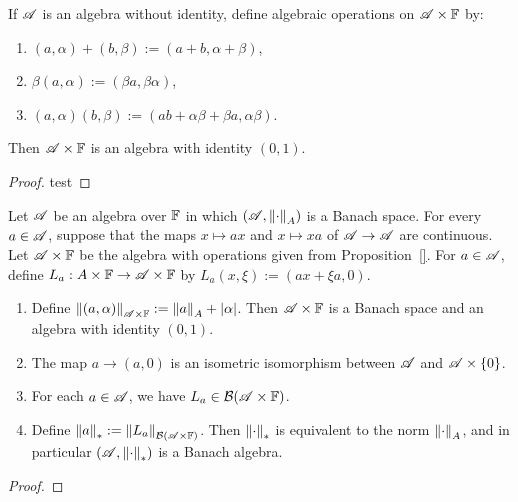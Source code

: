 \begin{proposition}
If $\mathscr{A}$ is an algebra without identity, define algebraic operations on $\mathscr{A} \times \mathbb{F}$ by:
	\mbox{}
	\begin{enumerate}[label = (\roman*),itemsep=1pt,topsep=3pt]
		\item $(a,\alpha) + (b,\beta) := (a+b,\alpha + \beta)$,
		\item $\beta(a,\alpha) := (\beta a, \beta \alpha)$,
		\item $(a,\alpha)(b,\beta) := (ab + \alpha \beta + \beta a, \alpha \beta)$.
	\end{enumerate}
	Then $\mathscr{A} \times \mathbb{F}$ is an algebra with identity $(0,1)$.
\end{proposition}
	{\color{red}
	\begin{proof}
			test
	\end{proof}}


\begin{proposition}
	Let $\mathscr{A}$ be an algebra over $\mathbb{F}$ in which $(\mathscr{A},\left\lVert \cdot \right\rVert_A)$ is a Banach space. For every $a \in \mathscr{A}$, suppose that the maps $x \mapsto ax$ and $x \mapsto xa$ of $\mathscr{A} \rightarrow \mathscr{A}$ are continuous. Let $\mathscr{A} \times \mathbb{F}$ be the algebra with operations given from Proposition~\ref{}. For $a \in \mathscr{A}$, define $L_a:A \times \mathbb{F} \rightarrow \mathscr{A} \times \mathbb{F}$ by $L_a(x,\xi) := (ax + \xi a,0)$.
\end{proposition}
	\mbox{}
	\begin{enumerate}[label = (\arabic*),itemsep=1pt,topsep=3pt]
		\item Define $\left\lVert (a,\alpha) \right\rVert_{\mathscr{A} \times \mathbb{F}}:= \left\lVert a \right\rVert_A + |\alpha|$. Then $\mathscr{A} \times \mathbb{F}$ is a Banach space and an algebra with identity $(0,1)$.
		\item The map $a \rightarrow (a,0)$ is an isometric isomorphism between $\mathscr{A}$ and $\mathscr{A} \times \{0\}$.
		\item For each $a \in \mathscr{A}$, we have $L_a \in \mathcal{B}(\mathscr{A} \times \mathbb{F})$.
		\item Define $\left\lVert a \right\rVert_{\ast} := \left\lVert L_a \right\rVert_{\mathcal{B}(\mathscr{A} \times \mathbb{F})}$. Then $\left\lVert \cdot \right\rVert_{\ast}$ is equivalent to the norm $\left\lVert \cdot \right\rVert_A$, and in particular $(\mathscr{A},\left\lVert \cdot \right\rVert_{\ast})$ is a Banach algebra.
	\end{enumerate}
	{\color{red}
	\begin{proof}
			
	\end{proof}}

